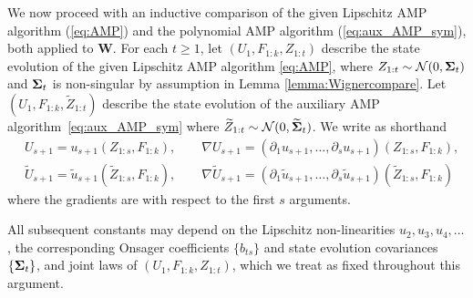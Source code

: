\documentclass[10pt,reqno]{amsart}
\def\W{\mathbf{W}}
\begin{document}
We now proceed with an inductive comparison of the given Lipschitz AMP algorithm
(\ref{eq:AMP}) and the polynomial AMP algorithm (\ref{eq:aux_AMP_sym}), both
applied to $\W$. 
For each $t \geq 1$, let $(U_1,F_{1:k},Z_{1:t})$ describe the 
state evolution of the given Lipschitz AMP algorithm \eqref{eq:AMP}, where $Z_{1:t} 
\sim \mathcal{N}(0, \bm{\Sigma}_t)$ and $\bm{\Sigma}_t$ is non-singular by assumption in Lemma
\ref{lemma:Wignercompare}.
Let $(U_1,F_{1:k},\widetilde Z_{1:t})$ describe
the state evolution of the auxiliary AMP algorithm~\eqref{eq:aux_AMP_sym} where 
$\widetilde Z_{1:t} \sim \mathcal{N}(0, \widetilde{\bm{\Sigma}}_t)$. We write as shorthand
\begin{align*}
&U_{s+1}=u_{s+1}(Z_{1:s},F_{1:k}), \qquad
\nabla U_{s+1}=(\partial_1 u_{s+1},\ldots,\partial_s u_{s+1})(Z_{1:s},F_{1:k}),\\
&\widetilde U_{s+1}=\tilde u_{s+1}(\widetilde Z_{1:s},F_{1:k}), \qquad
\nabla \widetilde U_{s+1}=(\partial_1 \tilde u_{s+1},\ldots,\partial_s \tilde
u_{s+1})(\widetilde Z_{1:s},F_{1:k})
\end{align*}
where the gradients are with respect to the first $s$ arguments.

All subsequent constants may depend on the Lipschitz
non-linearities $u_2,u_3,u_4,\ldots$, the corresponding Onsager coefficients
$\{b_{ts}\}$ and state evolution covariances $\{\bm{\Sigma}_t\}$,
and joint laws of $(U_1,F_{1:k},Z_{1:t})$, which we treat as
fixed throughout this argument.
\end{document}
